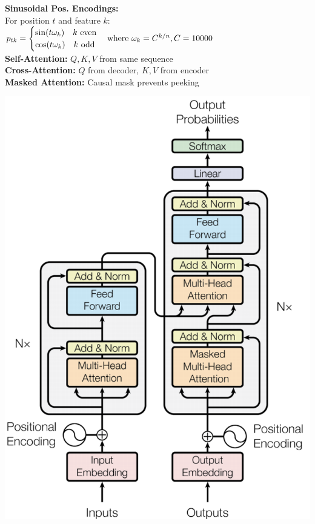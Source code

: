 \begin{minipage}{0.5\linewidth}
\textbf{Sinusoidal Pos. Encodings:}\\
For position $t$ and feature $k$:\\ $p_{tk}=\begin{cases} \sin(t\omega_k) \quad k \text{ even} \\ \cos(t\omega_k) \quad k \text{ odd} \end{cases}\\ \hfill \text{where } \omega_k=C^{k/n}, C=10000$\\

\textbf{Self-Attention:}
$Q,K,V$ from same sequence\\

\textbf{Cross-Attention:}
$Q$ from decoder, $K,V$ from encoder\\

\textbf{Masked Attention:}
Causal mask prevents peeking
\end{minipage}
\begin{minipage}{0.5\linewidth}
\includegraphics[angle=0, width=\linewidth]{transformer.png}\\
\end{minipage}

